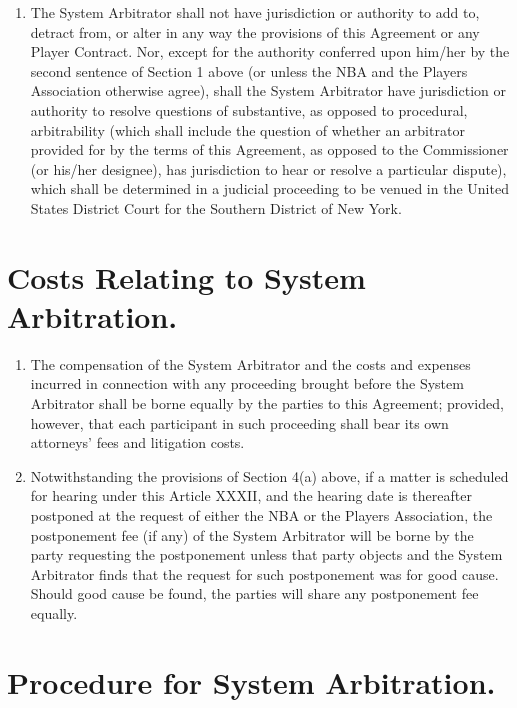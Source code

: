 \documentclass[
]{book}
\providecommand{\tightlist}{%
  \setlength{\itemsep}{0pt}\setlength{\parskip}{0pt}}
\begin{document}
\begin{enumerate}
\item
  The System Arbitrator shall not have jurisdiction or authority to add to, detract from, or alter in any way the provisions of this Agreement or any Player Contract. Nor, except for the authority conferred upon him/her by the second sentence of Section 1 above (or unless the NBA and the Players Association otherwise agree), shall the System Arbitrator have jurisdiction or authority to resolve questions of substantive, as opposed to procedural, arbitrability (which shall include the question of whether an arbitrator provided for by the terms of this Agreement, as opposed to the Commissioner (or his/her designee), has jurisdiction to hear or resolve a particular dispute), which shall be determined in a judicial proceeding to be venued in the United States District Court for the Southern District of New York.
\end{enumerate}

\hypertarget{costs-relating-to-system-arbitration.}{%
\section{Costs Relating to System Arbitration.}\label{costs-relating-to-system-arbitration.}}

\begin{enumerate}
\def\labelenumi{(\alph{enumi})}
\tightlist
\item
  The compensation of the System Arbitrator and the costs and expenses incurred in connection with any proceeding brought before the System Arbitrator shall be borne equally by the parties to this Agreement; provided, however, that each participant in such proceeding shall bear its own attorneys' fees and litigation costs.
\item
  Notwithstanding the provisions of Section 4(a) above, if a matter is scheduled for hearing under this Article XXXII, and the hearing date is thereafter postponed at the request of either the NBA or the Players Association, the postponement fee (if any) of the System Arbitrator will be borne by the party requesting the postponement unless that party objects and the System Arbitrator finds that the request for such postponement was for good cause. Should good cause be found, the parties will share any postponement fee equally.
\end{enumerate}

\hypertarget{procedure-for-system-arbitration.}{%
\section{Procedure for System Arbitration.}\label{procedure-for-system-arbitration.}}
\end{document}
